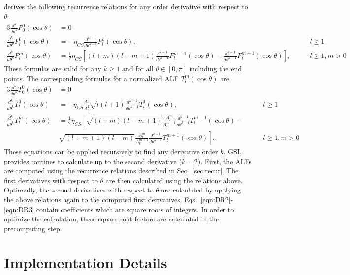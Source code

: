 \documentclass[12pt]{article}
\begin{document}
\citet{bosch2000} derives the following recurrence relations for any order
derivative with respect to $\theta$:
\begin{alignat}{3}
\frac{d^k}{d\theta^k} P_0^0(\cos{\theta}) &= 0 & \\
\frac{d^k}{d\theta^k} P_l^0(\cos{\theta}) &= -\eta_{CS} \frac{d^{k-1}}{d\theta^{k-1}} P_l^1(\cos{\theta}), & \qquad l \geq 1 \\
\frac{d^k}{d\theta^k} P_l^m(\cos{\theta}) &= \frac{1}{2} \eta_{CS} \left[ (l+m)(l-m+1) \frac{d^{k-1}}{d\theta^{k-1}} P_l^{m-1}(\cos{\theta}) - \frac{d^{k-1}}{d\theta^{k-1}} P_l^{m+1}(\cos{\theta}) \right], & \qquad l \geq 1, m > 0
\end{alignat}
These formulas are valid for any $k \geq 1$ and for all $\theta \in [0,\pi]$ including the end points.
The corresponding formulas for a normalized ALF $T_l^m(\cos{\theta})$ are
\begin{alignat}{3}
\frac{d^k}{d\theta^k} T_0^0(\cos{\theta}) &= 0 \\
\frac{d^k}{d\theta^k} T_l^0(\cos{\theta}) &= -\eta_{CS} \frac{A_l^0}{A_l^1} \sqrt{l(l+1)} \frac{d^{k-1}}{d\theta^{k-1}} T_l^1(\cos{\theta}), & \qquad l \geq 1 \label{eqn:DR2} \\
\frac{d^k}{d\theta^k} T_l^m(\cos{\theta}) &= \frac{1}{2} \eta_{CS}
\left[
\sqrt{(l+m)(l-m+1)} \frac{A_l^m}{A_l^{m-1}} \frac{d^{k-1}}{d\theta^{k-1}} T_l^{m-1}(\cos{\theta}) - \right. \nonumber \\
&
\left.
\sqrt{(l+m+1)(l-m)} \frac{A_l^m}{A_l^{m+1}} \frac{d^{k-1}}{d\theta^{k-1}} T_l^{m+1}(\cos{\theta})
\right], & \qquad l \geq 1, m > 0 \label{eqn:DR3}
\end{alignat}
These equations can be applied recursively to find any derivative order
$k$. GSL provides routines to calculate up to the second derivative
($k=2$). First, the ALFs are computed using the recurrence relations
described in Sec.~\ref{sec:recur}. The first derivatives with respect
to $\theta$ are then calculated using the relations above. Optionally,
the second derivatives with respect to $\theta$ are calculated by
applying the above relations again to the computed first derivatives.
Eqs.~\eqref{eqn:DR2}-\eqref{eqn:DR3} contain coefficients which are
square roots of integers. In order to optimize the calculation, these
square root factors are calculated in the precomputing step.

\section{Implementation Details}
\end{document}
